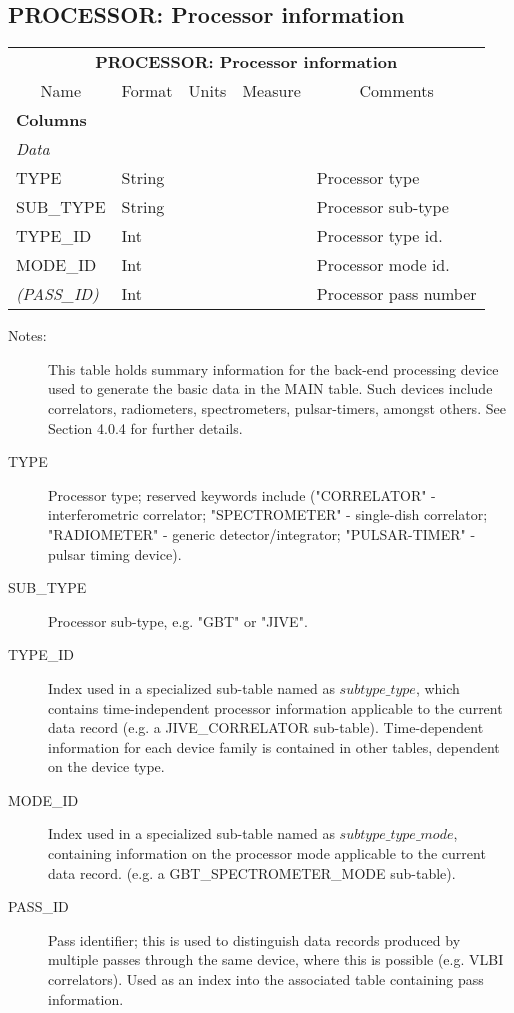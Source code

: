 \documentclass{article}
\newcommand{\defline}[1]{\cline{1-5}
\multicolumn{5}{|l|}{#1} \\
\cline{1-5}}
\newcommand{\definetable}[2]
{
	\vfill\newpage
	\subsection{#1}
        \vspace{0.15in}
        \small
	\begin{tabular}{|l|p{1.25in}|l|p{.9in}|p{1.4in}|}
	\hline
	\multicolumn{5}{|c|}{\bf #1}\\ 
	\cline{1-5}
        \multicolumn{1}{|c|}{Name}&\multicolumn{1}{|c|}{Format}&
        \multicolumn{1}{|c|}{Units}&\multicolumn{1}{|c|}{Measure}&
        \multicolumn{1}{|c|}{Comments}\\
        \cline{1-5}
        #2
        \hline
	\end{tabular}
}
\begin{document}
\definetable{PROCESSOR: Processor information}{
\defline{\bf Columns}
\defline{\em Data}
TYPE            & String & & & Processor type \\
SUB\_TYPE & String & & & Processor sub-type\\
TYPE\_ID  & Int & & & Processor type id.\\
MODE\_ID  & Int & & & Processor mode id.\\
{\it (PASS\_ID)}  & Int & & & Processor pass number\\
}
\begin{description}

\item[Notes:] This table holds summary information for the back-end
processing device used to generate the basic data in the MAIN
table. Such devices include correlators, radiometers, spectrometers,
pulsar-timers, amongst others. See Section 4.0.4 for further details.

\item[TYPE] Processor type; reserved keywords include ("CORRELATOR" -
interferometric correlator; "SPECTROMETER" - single-dish correlator;
"RADIOMETER" - generic detector/integrator; "PULSAR-TIMER" - pulsar
timing device).

\item[SUB\_TYPE] Processor sub-type, e.g. "GBT" or "JIVE".

\item[TYPE\_ID] Index used in a specialized sub-table named as
$subtype\_type$, which contains time-independent processor information
applicable to the current data record (e.g. a JIVE\_CORRELATOR
sub-table).  Time-dependent information for each device family is
contained in other tables, dependent on the device type.

\item[MODE\_ID] Index used in a specialized sub-table named as
$subtype\_type\_mode$, containing information on the processor mode
applicable to the current data record. (e.g. a GBT\_SPECTROMETER\_MODE
sub-table).

\item[PASS\_ID] Pass identifier; this is used to distinguish data records
produced by multiple passes through the same device, where this is
possible (e.g. VLBI correlators). Used as an index into the associated
table containing pass information.

\end{description}
\end{document}
